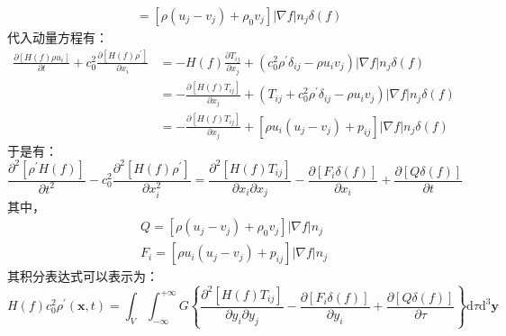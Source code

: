 \begin{enumerate}
\begin{equation}
\begin{aligned}
                &=\left[\rho\left(u_{j}-v_{j}\right)+\rho_{0} v_{j}\right] |\nabla f| n_{j} \delta(f)
            \end{aligned}
        \end{equation}
        代入动量方程有：
        \begin{equation}
            \begin{aligned}
                \frac{\partial\left[H(f) \rho u_{i}\right]}{\partial t}+c_{0}^{2} \frac{\partial\left[H(f) \rho^{\prime}\right]}{\partial x_{i}} 
                &=-H(f) \frac{\partial T_{i j}}{\partial x_{j}}+\left(c_{0}^{2} \rho^{\prime} \delta_{i j}-\rho u_{i} v_{j}\right) |\nabla f| n_{j} \delta(f) \\
                &=-\frac{\partial\left[H(f) T_{i j}\right]}{\partial x_{j}}+\left(T_{i j}+c_{0}^{2} \rho^{\prime} \delta_{i j}-\rho u_{i} v_{j}\right) |\nabla f| n_{j} \delta(f) \\
                &=-\frac{\partial\left[H(f) T_{i j}\right]}{\partial x_{j}}+\left[\rho u_{i}\left(u_{j}-v_{j}\right)+p_{i j}\right] |\nabla f| n_{j} \delta(f)
            \end{aligned}
        \end{equation}
        于是有：
        \begin{equation}
            \frac{\partial^{2}\left[\rho^{\prime} H(f)\right]}{\partial t^{2}}-c_{0}^{2} \frac{\partial^{2}\left[H(f) \rho^{\prime}\right]}{\partial x_{i}^{2}}
            =\frac{\partial^{2}\left[H(f) T_{i j}\right]}{\partial x_{i} \partial x_{j}}-\frac{\partial\left[F_{i} \delta(f)\right]}{\partial x_{i}}+\frac{\partial[Q \delta(f)]}{\partial t}
        \end{equation}
        其中，
        \begin{equation*}
            \begin{aligned}
                Q=\left[\rho\left(u_{j}-v_{j}\right)+\rho_{0} v_{j}\right] |\nabla f| n_{j} \\
                F_{i}=\left[\rho u_{i}\left(u_{j}-v_{j}\right)+p_{i j}\right] |\nabla f| n_{j}
            \end{aligned}
        \end{equation*}
        其积分表达式可以表示为：
        \begin{equation}
            H(f) c_{0}^{2} \rho^{\prime}(\mathbf{x}, t)
            =\int_{V} \int_{-\infty}^{+\infty} G\left\{\frac{\partial^{2}\left[H(f) T_{i j}\right]}{\partial y_{i} \partial y_{j}}-\frac{\partial\left[F_{i} \delta(f)\right]}{\partial y_{i}}+\frac{\partial[Q \delta(f)]}{\partial \tau}\right\} \mathrm{d} \tau \mathrm{d}^{3} \mathbf{y}

\end{equation}
\end{enumerate}
